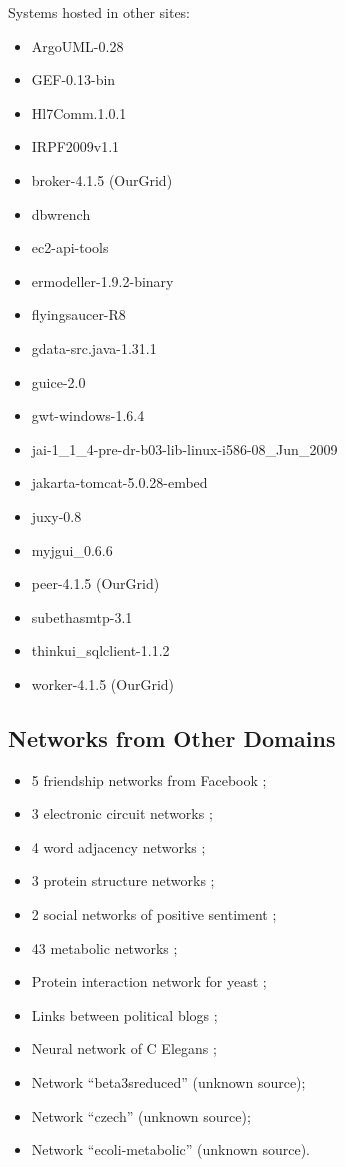 Systems hosted in other sites:

\begin{itemize}
\item ArgoUML-0.28
\item GEF-0.13-bin
\item Hl7Comm.1.0.1
\item IRPF2009v1.1
\item broker-4.1.5 (OurGrid)
\item dbwrench
\item ec2-api-tools
\item ermodeller-1.9.2-binary
\item flyingsaucer-R8
\item gdata-src.java-1.31.1
\item guice-2.0
\item gwt-windows-1.6.4
\item jai-1\_1\_4-pre-dr-b03-lib-linux-i586-08\_Jun\_2009
\item jakarta-tomcat-5.0.28-embed
\item juxy-0.8
\item myjgui\_0.6.6
\item peer-4.1.5 (OurGrid)
\item subethasmtp-3.1
\item thinkui\_sqlclient-1.1.2
\item worker-4.1.5 (OurGrid)
\end{itemize}

\subsection{Networks from Other Domains}

\begin{itemize}
\item 5 friendship networks from Facebook \cite{Traud2008};
\item 3 electronic circuit networks \cite{Milo2004};
\item 4 word adjacency networks \cite{Milo2004};
\item 3 protein structure networks \cite{Milo2004};
\item 2 social networks of positive sentiment \cite{Milo2004};
\item 43 metabolic networks \cite{Jeong2000};
\item Protein interaction network for yeast \cite{Jeong2001};
\item Links between political blogs \cite{Adamic2005};
\item Neural network of C Elegans \cite{Watts1998};
\item Network ``beta3sreduced'' (unknown source);
\item Network ``czech'' (unknown source);
\item Network ``ecoli-metabolic'' (unknown source).
\end{itemize}

